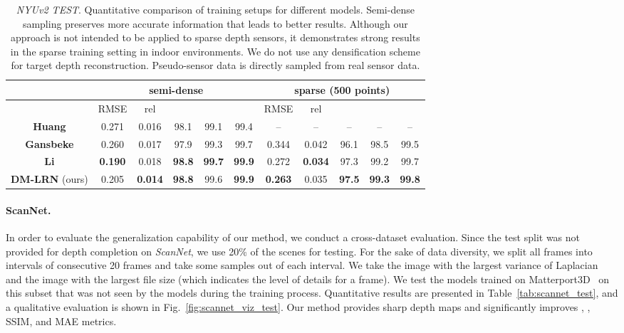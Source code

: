 \documentclass[final]{cvpr}
\begin{document}
    \begin{table*}[ht]
    \setlength{\tabcolsep}{5pt}
    \renewcommand{\arraystretch}{1.0}
    \centering
	\begin{tabular}{|c|c|c|c|c|c|c|c|c|c|c|}
	    \hline
	    & \multicolumn{5}{|c}{semi-dense} & \multicolumn{5}{|c}{sparse (500 points)} \vline\\
	    \hline
	    & RMSE  & rel  &   &   &   & RMSE  & rel  &   &   &   \\
		\hline
		\hline
		\textbf{Huang \etal \cite{Huang_2019}} & 0.271 & 0.016 & 98.1 & 99.1 & 99.4 & -- & -- & -- & -- & -- \\
		\textbf{Gansbeke} \etal \cite{wvangansbeke_depth_2019} & 0.260 & 0.017 & 97.9 & 99.3 & 99.7 & 0.344 & 0.042 & 96.1 & 98.5 & 99.5 \\
		\textbf{Li} \etal \cite{msg_chn} & \textbf{0.190} & 0.018 & \textbf{98.8} & \textbf{99.7} & \textbf{99.9} & 0.272 & \textbf{0.034} & 97.3 & 99.2 & 99.7 \\
		\hline
		\textbf{DM-LRN} (ours) & 0.205 & \textbf{0.014} & \textbf{98.8} & 99.6 & \textbf{99.9} & \textbf{0.263} & 0.035 & \textbf{97.5} & \textbf{99.3} & \textbf{99.8} \\
		\hline
	\end{tabular}
	\vspace{0.1cm}
	\caption{\emph{NYUv2 TEST}. Quantitative comparison of training setups for different models. Semi-dense sampling preserves more accurate information that leads to better results. Although our approach is not intended to be applied to sparse depth sensors, it demonstrates strong results in the sparse training setting in indoor environments. We do not use any densification scheme for target depth reconstruction. Pseudo-sensor data is directly sampled from real sensor data.}
	\label{tab:nyu_test}
    \end{table*}
    
    \paragraph{ScanNet.} 
In order to evaluate the generalization capability of our method, we conduct a cross-dataset evaluation. Since the test split was not provided for depth completion on \emph{ScanNet}, we use 20\% of the scenes for testing. For the sake of data diversity, we split all frames into intervals of consecutive 20 frames and take some samples out of each interval. We take the image with the largest variance of Laplacian~\cite{blurdetection} and the image with the largest file size (which indicates the level of details for a frame). We test the models trained on Matterport3D~\cite{Matterport3D} on this subset that was not seen by the models during the training process. Quantitative results are presented in Table~\ref{tab:scannet_test}, and a qualitative evaluation is shown in Fig.~\ref{fig:scannet_viz_test}. Our method provides sharp depth maps and significantly improves , , SSIM, and MAE metrics.
    
\end{document}
